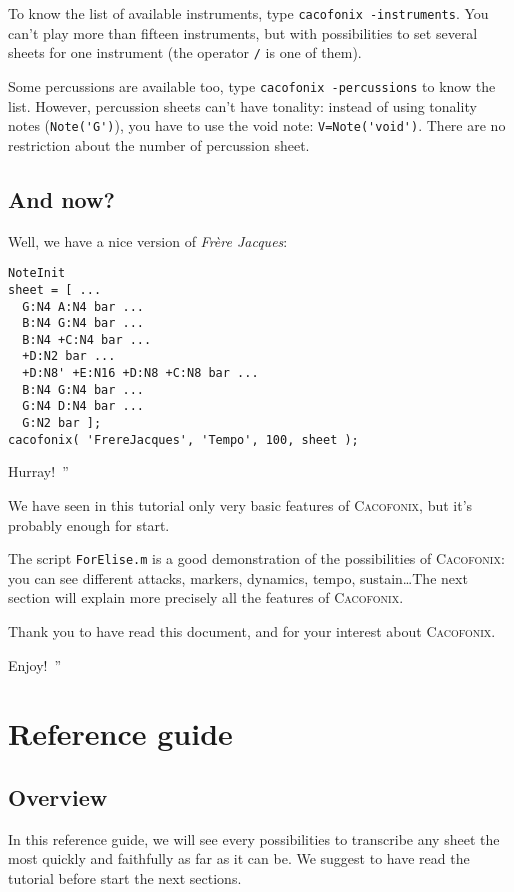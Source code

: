 \documentclass{article}
\newcommand{\cacofonix}{\textsc{Cacofonix}\xspace}
\newcommand{\frerejaques}{\emph{Fr\`ere Jacques}\xspace}
\newcommand{\file}[1]{\texttt{#1}\xspace}
\newenvironment{meenv}{ \par \noindent \makebox[6em][r]{ \textcolor{mecolor}{Me}: `` --~}}{~''}
\newenvironment{myselfenv}{ \par \noindent \makebox[6em][r]{ \textcolor{myselfcolor}{Myself}: `` --~}}{~''}
\newcommand{\me}[1]{\begin{meenv}#1\end{meenv}}
\newcommand{\myself}[1]{\begin{myselfenv}#1\end{myselfenv}}
\begin{document}
To know the list of available instruments, type \lstinline!cacofonix -instruments!. You can't play more than fifteen instruments, but with possibilities to set several sheets for one instrument (the operator \lstinline!/! is one of them).

Some percussions are available too, type \lstinline!cacofonix -percussions! to know the list. However, percussion sheets can't have tonality: instead of using tonality notes (\lstinline!Note('G')!), you have to use the void note: \lstinline!V=Note('void')!. There are no restriction about the number of percussion sheet.

\subsection{And now?}

Well, we have a nice version of \frerejaques:
\begin{lstlisting}
NoteInit
sheet = [ ...
  G:N4 A:N4 bar ...
  B:N4 G:N4 bar ...
  B:N4 +C:N4 bar ...
  +D:N2 bar ...
  +D:N8' +E:N16 +D:N8 +C:N8 bar ...
  B:N4 G:N4 bar ...
  G:N4 D:N4 bar ...
  G:N2 bar ];
cacofonix( 'FrereJacques', 'Tempo', 100, sheet );
\end{lstlisting}

\me{Hurray!}

We have seen in this tutorial only very basic features of \cacofonix, but it's probably enough for start.

The script \file{ForElise.m} is a good demonstration of the possibilities of \cacofonix: you can see different attacks, markers, dynamics, tempo, sustain\dots The next section will explain more precisely all the features of \cacofonix.

Thank you to have read this document, and for your interest about \cacofonix.

\myself{Enjoy!}

\section{Reference guide}

\subsection{Overview}

In this reference guide, we will see every possibilities to transcribe any sheet the most quickly and faithfully as far as it can be. We suggest to have read the tutorial before start the next sections.
\end{document}
